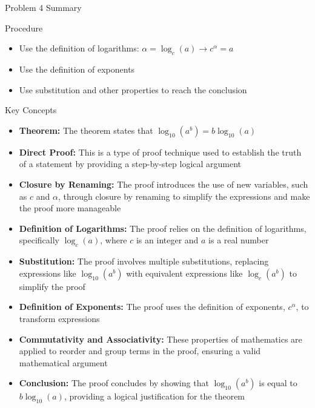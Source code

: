 \begin{summary}{Problem 4 Summary}
    \begin{statement}{Procedure}
        \begin{itemize}
            \item Use the definition of logarithms: $\alpha = \log_{c}(a) \rightarrow c^{\alpha} = a$
            \item Use the definition of exponents
            \item Use substitution and other properties to reach the conclusion 
        \end{itemize}
    \end{statement}
    \begin{statement}{Key Concepts}
        \begin{itemize}
            \item \textbf{Theorem:} The theorem states that $\log_{10}{(a^{b})} = b \log_{10}{(a)}$
            \item \textbf{Direct Proof:} This is a type of proof technique used to establish the truth of a statement by providing a step-by-step logical argument
            \item \textbf{Closure by Renaming:} The proof introduces the use of new variables, such as $c$ and $\alpha$, through closure by renaming to simplify the expressions and make the proof more manageable
            \item \textbf{Definition of Logarithms:} The proof relies on the definition of logarithms, specifically $\log_{c}{(a)}$, where $c$ is an integer and $a$ is a real number
            \item \textbf{Substitution:} The proof involves multiple substitutions, replacing expressions like $\log_{10}{(a^{b})}$ with equivalent expressions like $\log_{c}{(a^{b})}$ to simplify the proof
            \item \textbf{Definition of Exponents:} The proof uses the definition of exponents, $c^{\alpha}$, to transform expressions
            \item \textbf{Commutativity and Associativity:} These properties of mathematics are applied to reorder and group terms in the proof, ensuring a valid mathematical argument
            \item \textbf{Conclusion:} The proof concludes by showing that $\log_{10}{(a^{b})}$ is equal to $b\log_{10}{(a)}$, providing a logical justification for the theorem
        \end{itemize}        
    \end{statement}

\end{summary}
